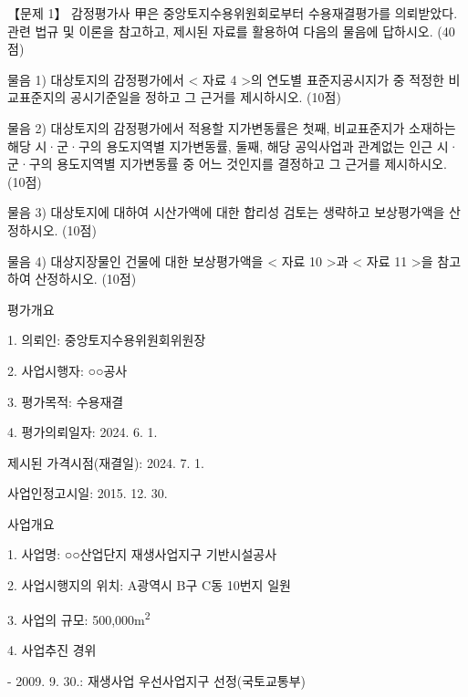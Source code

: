\begin{longquestion}{【문제 1】}
감정평가사 甲은 중앙토지수용위원회로부터 수용재결평가를 의뢰받았다. 관련 법규 및 이론을 참고하고, 제시된 자료를 활용하여 다음의 물음에 답하시오. (40점) \par
\medskip\noindent 물음 1) 대상토지의 감정평가에서 < 자료 4 >의 연도별 표준지공시지가 중 적정한 비교표준지의 공시기준일을 정하고 그 근거를 제시하시오. (10점) \par
\medskip\noindent 물음 2) 대상토지의 감정평가에서 적용할 지가변동률은 첫째, 비교표준지가 소재하는 해당 시·군·구의 용도지역별 지가변동률, 둘째, 해당 공익사업과 관계없는 인근 시·군·구의 용도지역별 지가변동률 중 어느 것인지를 결정하고 그 근거를 제시하시오. (10점) \par
\medskip\noindent 물음 3) 대상토지에 대하여 시산가액에 대한 합리성 검토는 생략하고 보상평가액을 산정하시오. (10점) \par
\medskip\noindent 물음 4) 대상지장물인 건물에 대한 보상평가액을 < 자료 10 >과 < 자료 11 >을 참고하여 산정하시오. (10점) \par
\medskip{} 평가개요 \par
1. 의뢰인: 중앙토지수용위원회위원장 \par
2. 사업시행자: ○○공사 \par
3. 평가목적: 수용재결 \par
4. 평가의뢰일자: 2024. 6. 1. \par
\hspace*{1.2em}제시된 가격시점(재결일): 2024. 7. 1. \par
\hspace*{1.2em}사업인정고시일: 2015. 12. 30. \par
\medskip{} 사업개요 \par
1. 사업명: ○○산업단지 재생사업지구 기반시설공사 \par
2. 사업시행지의 위치: A광역시 B구 C동 10번지 일원 \par
3. 사업의 규모: 500,000m\textsuperscript{2} \par
4. 사업추진 경위 \par
\hspace*{1em}- 2009. 9. 30.: 재생사업 우선사업지구 선정(국토교통부) \par

\end{longquestion}
